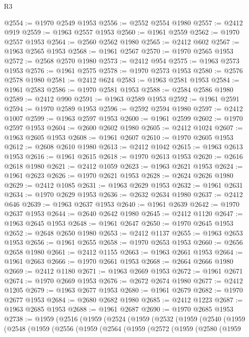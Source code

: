 \begin{lexlean}{R3}
\begin{coremodule}
@2554 := @1970 @2549 @1953
@2556 := @2552 @2554 @1980
@2557 := @2412 @919
@2559 := @1963 @2557 @1953
@2560 := @1961 @2559
@2562 := @1970 @2557 @1953
@2564 := @2560 @2562 @1980
@2565 := @2412 @602
@2567 := @1963 @2565 @1953
@2568 := @1961 @2567
@2570 := @1970 @2565 @1953
@2572 := @2568 @2570 @1980
@2573 := @2412 @954
@2575 := @1963 @2573 @1953
@2576 := @1961 @2575
@2578 := @1970 @2573 @1953
@2580 := @2576 @2578 @1980
@2581 := @2412 @624
@2583 := @1963 @2581 @1953
@2584 := @1961 @2583
@2586 := @1970 @2581 @1953
@2588 := @2584 @2586 @1980
@2589 := @2412 @990
@2591 := @1963 @2589 @1953
@2592 := @1961 @2591
@2594 := @1970 @2589 @1953
@2596 := @2592 @2594 @1980
@2597 := @2412 @1007
@2599 := @1963 @2597 @1953
@2600 := @1961 @2599
@2602 := @1970 @2597 @1953
@2604 := @2600 @2602 @1980
@2605 := @2412 @1024
@2607 := @1963 @2605 @1953
@2608 := @1961 @2607
@2610 := @1970 @2605 @1953
@2612 := @2608 @2610 @1980
@2613 := @2412 @1042
@2615 := @1963 @2613 @1953
@2616 := @1961 @2615
@2618 := @1970 @2613 @1953
@2620 := @2616 @2618 @1980
@2621 := @2412 @1059
@2623 := @1963 @2621 @1953
@2624 := @1961 @2623
@2626 := @1970 @2621 @1953
@2628 := @2624 @2626 @1980
@2629 := @2412 @1085
@2631 := @1963 @2629 @1953
@2632 := @1961 @2631
@2634 := @1970 @2629 @1953
@2636 := @2632 @2634 @1980
@2637 := @2412 @646
@2639 := @1963 @2637 @1953
@2640 := @1961 @2639
@2642 := @1970 @2637 @1953
@2644 := @2640 @2642 @1980
@2645 := @2412 @1120
@2647 := @1963 @2645 @1953
@2648 := @1961 @2647
@2650 := @1970 @2645 @1953
@2652 := @2648 @2650 @1980
@2653 := @2412 @1137
@2655 := @1963 @2653 @1953
@2656 := @1961 @2655
@2658 := @1970 @2653 @1953
@2660 := @2656 @2658 @1980
@2661 := @2412 @1155
@2663 := @1963 @2661 @1953
@2664 := @1961 @2663
@2666 := @1970 @2661 @1953
@2668 := @2664 @2666 @1980
@2669 := @2412 @1180
@2671 := @1963 @2669 @1953
@2672 := @1961 @2671
@2674 := @1970 @2669 @1953
@2676 := @2672 @2674 @1980
@2677 := @2412 @1205
@2679 := @1963 @2677 @1953
@2680 := @1961 @2679
@2682 := @1970 @2677 @1953
@2684 := @2680 @2682 @1980
@2685 := @2412 @1223
@2687 := @1963 @2685 @1953
@2688 := @1961 @2687
@2690 := @1970 @2685 @1953
@2738 := @1959
    (@2516
      (@1959
        (@2524
          (@1959
            (@2532
              (@1959
                (@2540
                  (@1959
                    (@2548
                      (@1959
                        (@2556
                          (@1959
                            (@2564
                              (@1959
                                (@2572
                                  (@1959
                                    (@2580
                                      (@1959

\end{coremodule}
\end{lexlean}
